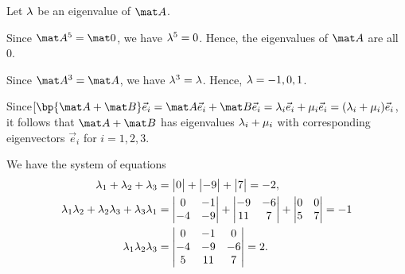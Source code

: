 \begin{solution}
    \begin{ppart}
        Let $\lambda$ be an eigenvalue of $\mat A$.

        \begin{psubpart}
            Since $\mat A^5 = \mat 0$, we have $\lambda^5 = 0$. Hence, the eigenvalues of $\mat A$ are all 0.
        \end{psubpart}
        \begin{psubpart}
            Since $\mat A^3 = \mat A$, we have $\lambda^3 = \lambda$. Hence, $\lambda = -1, 0, 1$.
        \end{psubpart}
    \end{ppart}
    \begin{ppart}
        \begin{psubpart}
            Since$[\bp{\mat A + \mat B} \vec e_i = \mat A \vec e_i + \mat B \vec e_i = \l_i \vec e_i + \m_i \vec e_i = (\l_i + \m_i) \vec e_i$, it follows that $\mat A + \mat B$ has eigenvalues $\lambda_i + \mu_i$ with corresponding eigenvectors $\vec e_i$ for $i = 1, 2, 3$.
        \end{psubpart}
        \begin{psubpart}
            We have the system of equations
            \begin{align*}
                \lambda_1 + \lambda_2 + \lambda_3 &= \begin{vmatrix}0\end{vmatrix} + \begin{vmatrix}-9\end{vmatrix} + \begin{vmatrix}7\end{vmatrix} = -2,\\
                \lambda_1 \lambda_2 + \lambda_2 \lambda_3 + \lambda_3 \lambda_1 &= \begin{vmatrix}0 & -1 \\ -4 & -9\end{vmatrix} + \begin{vmatrix}-9 & -6 \\ 11 & 7\end{vmatrix} + \begin{vmatrix}0 & 0 \\ 5 & 7\end{vmatrix} = -1 \\
                \lambda_1 \lambda_2 \lambda_3 &= \begin{vmatrix}0 & -1 & 0 \\ -4 & -9 & -6 \\ 5 & 11 & 7\end{vmatrix} = 2.
            \end{align*}
            

\end{psubpart}
\end{ppart}
\end{solution}
